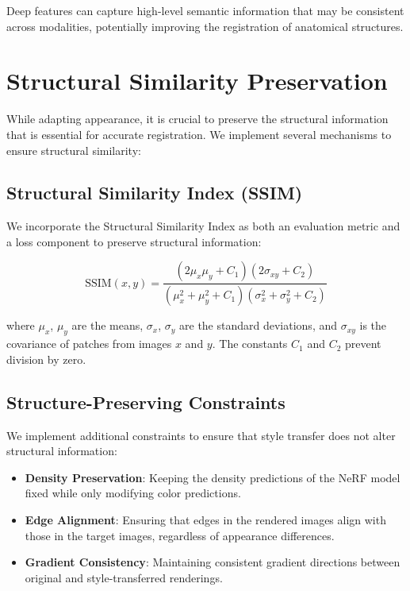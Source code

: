 Deep features can capture high-level semantic information that may be consistent across modalities, potentially improving the registration of anatomical structures.

\section{Structural Similarity Preservation}

While adapting appearance, it is crucial to preserve the structural information that is essential for accurate registration. We implement several mechanisms to ensure structural similarity:

\subsection{Structural Similarity Index (SSIM)}

We incorporate the Structural Similarity Index as both an evaluation metric and a loss component to preserve structural information:

\begin{equation}
    \text{SSIM}(x, y) = \frac{(2\mu_x\mu_y + C_1)(2\sigma_{xy} + C_2)}{(\mu_x^2 + \mu_y^2 + C_1)(\sigma_x^2 + \sigma_y^2 + C_2)}
\end{equation}

where $\mu_x$, $\mu_y$ are the means, $\sigma_x$, $\sigma_y$ are the standard deviations, and $\sigma_{xy}$ is the covariance of patches from images $x$ and $y$. The constants $C_1$ and $C_2$ prevent division by zero.

\subsection{Structure-Preserving Constraints}

We implement additional constraints to ensure that style transfer does not alter structural information:

\begin{itemize}
    \item \textbf{Density Preservation}: Keeping the density predictions of the NeRF model fixed while only modifying color predictions.
    
    \item \textbf{Edge Alignment}: Ensuring that edges in the rendered images align with those in the target images, regardless of appearance differences.
    
    \item \textbf{Gradient Consistency}: Maintaining consistent gradient directions between original and style-transferred renderings.
\end{itemize}

